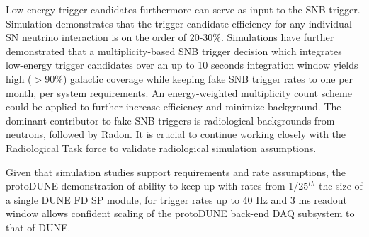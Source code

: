 Low-energy trigger candidates furthermore can serve as input to the
SNB trigger. Simulation demonstrates that the trigger candidate
efficiency for any individual SN neutrino interaction is on the order
of 20-30\%. Simulations have further demonstrated that a
multiplicity-based SNB trigger decision which integrates low-energy
trigger candidates over an up to 10 seconds
integration window yields high ($>90$\%) galactic coverage while
keeping fake SNB trigger rates to one per month, per system
requirements. An energy-weighted multiplicity count scheme could be
applied to further increase efficiency and minimize background.
The dominant contributor to fake SNB triggers is
radiological backgrounds from neutrons, followed by Radon. It is
crucial to continue working closely with the Radiological Task force
to validate radiological simulation assumptions.

Given that simulation studies support requirements and rate
assumptions, the protoDUNE demonstration of ability to keep up with
rates from 1/25$^{th}$ the size of a single DUNE FD SP module, for trigger
rates up to 40 Hz and 3 ms readout window 
allows confident scaling of the protoDUNE back-end DAQ subsystem to
that of DUNE.





